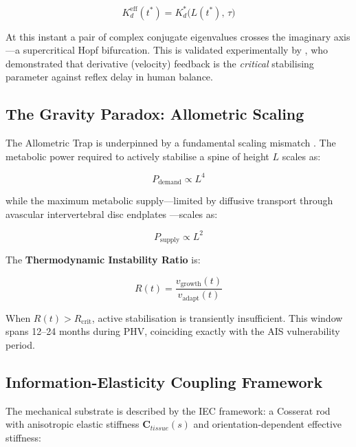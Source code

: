 \documentclass[12pt, letterpaper]{article}
\newcommand{\Kdcrit}{K_d^{*}}
\newcommand{\Kdeff}{K_d^{\mathrm{eff}}}
\newcommand{\Rt}{R(t)}
\begin{document}
\begin{equation}
  \Kdeff(t^{*}) = \Kdcrit\!\bigl(L(t^{*}),\,\tau\bigr)
  \label{eq:crossing}
\end{equation}

At this instant a pair of complex conjugate eigenvalues crosses the imaginary
axis---a supercritical Hopf bifurcation. This is validated experimentally by
\citet{Insperger2013}, who demonstrated that derivative (velocity) feedback is the
\emph{critical} stabilising parameter against reflex delay in human balance.

\subsection{The Gravity Paradox: Allometric Scaling}

The Allometric Trap is underpinned by a fundamental scaling mismatch
\citep{McMahon1973, Biewener1989}. The metabolic power required to actively
stabilise a spine of height $L$ scales as:

\begin{equation}
  P_{\mathrm{demand}} \propto L^{4}
  \label{eq:demand}
\end{equation}

while the maximum metabolic supply---limited by diffusive transport through
avascular intervertebral disc endplates \citep{Urban2004}---scales as:

\begin{equation}
  P_{\mathrm{supply}} \propto L^{2}
  \label{eq:supply}
\end{equation}

The \textbf{Thermodynamic Instability Ratio} is:

\begin{equation}
  \Rt = \frac{v_{\mathrm{growth}}(t)}{v_{\mathrm{adapt}}(t)}
  \label{eq:ratio}
\end{equation}

When $\Rt > R_{\mathrm{crit}}$, active stabilisation is transiently insufficient.
This window spans 12--24 months during PHV, coinciding exactly with the
AIS vulnerability period.

\subsection{Information-Elasticity Coupling Framework}

The mechanical substrate is described by the IEC framework: a Cosserat rod
\citep{Antman2005} with anisotropic elastic stiffness $\mathbf{C}_{tissue}(s)$
and orientation-dependent effective stiffness:
\end{document}
